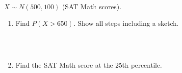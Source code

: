 \documentclass[10pt]{article}
\begin{document}
\begin{practicebox}
$X \sim N(500, 100)$ (SAT Math scores).
\begin{enumerate}
  \item Find $P(X > 650)$. Show all steps including a sketch.

        \par\vspace{-\parskip}\nointerlineskip\noindent\begin{minipage}[t][1.0in][t]{\linewidth}\vspace*{2pt}\\
        \\
        \end{minipage}

  \item Find the SAT Math score at the 25th percentile.

        \par\vspace{-\parskip}\nointerlineskip\noindent\begin{minipage}[t][0.8in][t]{\linewidth}\vspace*{2pt}\\
        \end{minipage}
\end{enumerate}
\end{practicebox}
\end{document}
